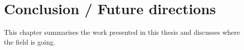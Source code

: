\chapter{Conclusion / Future directions}

\ifpdf
    \graphicspath{{Chapter7/Figs/Raster/}{Chapter7/Figs/PDF/}{Chapter7/Figs/}}
\else
    \graphicspath{{Chapter7/Figs/Vector/}{Chapter7/Figs/}}
\fi

This chapter summarises the work presented in this thesis and discusses where the field is going.
